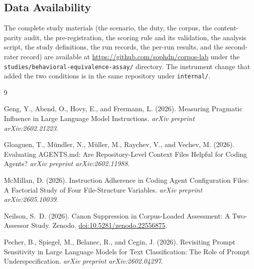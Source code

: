 \documentclass[11pt,a4paper]{article}
\begin{document}
\subsection{Data Availability}\label{sec:availability}

The complete study materials (the scenario, the duty, the corpus, the content-parity
audit, the pre-registration, the scoring rule and its validation, the analysis script, the
study definitions, the run records, the per-run results, and the second-rater record) are
available at \url{https://github.com/sophdn/corpos-lab} under the
\texttt{studies/behavioral-equivalence-assay/} directory. The instrument change that
added the two conditions is in the same repository under \texttt{internal/}.



\begin{thebibliography}{9}

Geng, Y., Abend, O., Hovy, E., and Frermann, L. (2026).
\newblock Measuring Pragmatic Influence in Large Language Model Instructions.
\newblock \emph{arXiv preprint arXiv:2602.21223}.

Gloaguen, T., Mündler, N., Müller, M., Raychev, V., and Vechev, M. (2026).
\newblock Evaluating AGENTS.md: Are Repository-Level Context Files Helpful for Coding
  Agents?
\newblock \emph{arXiv preprint arXiv:2602.11988}.

McMillan, D. (2026).
\newblock Instruction Adherence in Coding Agent Configuration Files: A Factorial Study of
  Four File-Structure Variables.
\newblock \emph{arXiv preprint arXiv:2605.10039}.

Neilson, S.~D. (2026).
\newblock Canon Suppression in Corpus-Loaded Assessment: A Two-Assessor Study.
\newblock Zenodo. \href{https://doi.org/10.5281/zenodo.22556875}{doi:10.5281/zenodo.22556875}.

Pecher, B., Spiegel, M., Belanec, R., and Cegin, J. (2026).
\newblock Revisiting Prompt Sensitivity in Large Language Models for Text Classification:
  The Role of Prompt Underspecification.
\newblock \emph{arXiv preprint arXiv:2602.04297}.

\end{thebibliography}

\appendix
\end{document}

